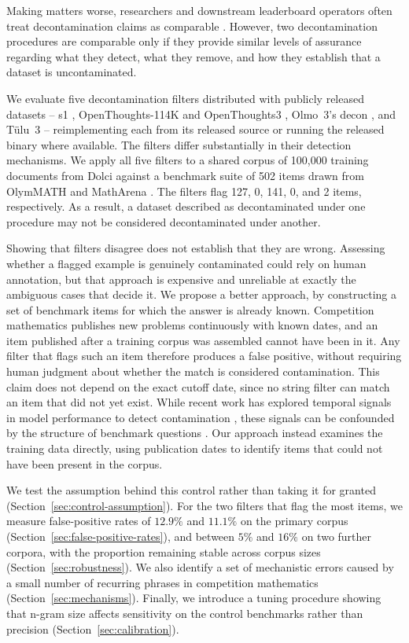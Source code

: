 \documentclass[11pt]{article}
\begin{document}
Making matters worse, researchers and downstream leaderboard operators often treat decontamination claims as comparable \citep{leaderboardillusion}. However, two decontamination procedures are comparable only if they provide similar levels of assurance regarding what they detect, what they remove, and how they establish that a dataset is uncontaminated.

We evaluate five decontamination filters distributed with publicly released datasets -- s1 \citep{s1}, OpenThoughts-114K and OpenThoughts3 \citep{openthoughts}, Olmo~3's decon \citep{olmo2025olmo3}, and T\"{u}lu~3 \citep{tulu3} -- reimplementing each from its released source or running the released binary where available. The filters differ substantially in their detection mechanisms. We apply all five filters to a shared corpus of 100,000 training documents from Dolci \citep{olmo2025olmo3} against a benchmark suite of 502 items drawn from OlymMATH \citep{olymmath} and MathArena \citep{matharena}. The filters flag 127, 0, 141, 0, and 2 items, respectively. As a result, a dataset described as decontaminated under one procedure may not be considered decontaminated under another.

Showing that filters disagree does not establish that they are wrong. Assessing whether a flagged example is genuinely contaminated could rely on human annotation, but that approach is expensive and unreliable at exactly the ambiguous cases that decide it. We propose a better approach, by constructing a set of benchmark items for which the answer is already known. Competition mathematics publishes new problems continuously with known dates, and an item published after a training corpus was assembled cannot have been in it. Any filter that flags such an item therefore produces a false positive, without requiring human judgment about whether the match is considered contamination. This claim does not depend on the exact cutoff date, since no string filter can match an item that did not yet exist. While recent work has explored temporal signals in model performance to detect contamination \citep{ICLR2024_2d04d975}, these signals can be confounded by the structure of benchmark questions \citep{zhang-etal-2026-test}. Our approach instead examines the training data directly, using publication dates to identify items that could not have been present in the corpus.

We test the assumption behind this control rather than taking it for granted (Section~\ref{sec:control-assumption}). For the two filters that flag the most items, we measure false-positive rates of $12.9\%$ and $11.1\%$ on the primary corpus (Section~\ref{sec:false-positive-rates}), and between $5\%$ and $16\%$ on two further corpora, with the proportion remaining stable across corpus sizes (Section~\ref{sec:robustness}). We also identify a set of mechanistic errors caused by a small number of recurring phrases in competition mathematics (Section~\ref{sec:mechanisms}). Finally, we introduce a tuning procedure showing that n-gram size affects sensitivity on the control benchmarks rather than precision (Section~\ref{sec:calibration}).
\end{document}
